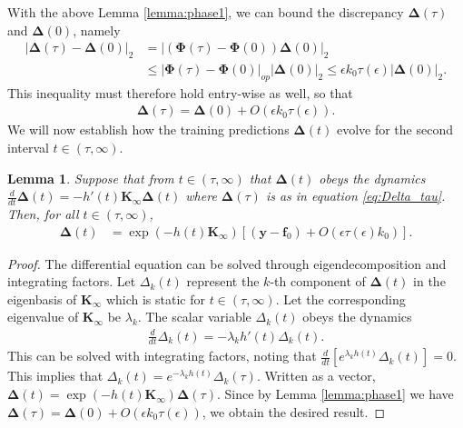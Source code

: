 \documentclass{article} %
\newtheorem{lemma}{Lemma}
\begin{document}
\begin{appendix}
With the above Lemma \ref{lemma:phase1}, we can bound the discrepancy $\bm\Delta(\tau)$ and $\bm\Delta(0)$, namely
\begin{equation}
\begin{aligned}
    |\bm\Delta(\tau) - \bm\Delta(0)|_2 &= |(\bm\Phi(\tau) - \bm\Phi(0) ) \bm\Delta(0)|_2\\
    &\leq |\bm \Phi(\tau) - \bm\Phi(0)|_{op} |\bm\Delta(0)|_2 \leq \epsilon k_0 \tau(\epsilon) |\bm\Delta(0)|_2.
\end{aligned}
\end{equation}
This inequality must therefore hold entry-wise as well, so that
\begin{align}\label{eq:Delta_tau}
    \bm\Delta(\tau)  = \bm\Delta(0) + O(\epsilon k_0 \tau(\epsilon)) .
\end{align} 
We will now establish how the training predictions $\bm\Delta(t)$ evolve for the second interval $t \in (\tau,\infty)$.
\begin{lemma}\label{lemma:phase2}
    Suppose that from $t\in(\tau,\infty)$ that $\bm\Delta(t)$ obeys the dynamics $\frac{d}{dt} \bm\Delta(t) = - h'(t) \bm K_{\infty} \bm\Delta(t)$ where $\bm \Delta(\tau)$ is as in equation \ref{eq:Delta_tau}. Then, for all $t \in (\tau,\infty)$, 
    \begin{equation}
\begin{aligned}
    \bm\Delta(t) &=   \exp\left( - h(t) \bm K_{\infty}  \right) \left[  (\bm y - \bm f_0) +  O(\epsilon \tau(\epsilon) k_0) \right] .
\end{aligned}
\end{equation}
\end{lemma}
\begin{proof}
    The differential equation can be solved through eigendecomposition and integrating factors. Let $\Delta_k(t)$ represent the $k$-th component of $\bm\Delta(t)$ in the eigenbasis of $\bm K_{\infty}$ which is static for $t\in(\tau,\infty)$. Let the corresponding eigenvalue of $\bm K_{\infty}$ be $\lambda_k$. The scalar variable $\Delta_k(t)$ obeys the dynamics
    \begin{align}
        \frac{d}{dt} \Delta_k(t) = - \lambda_k h'(t)  \Delta_k(t).
    \end{align}
    This can be solved with integrating factors, noting that $\frac{d}{dt} \left[ e^{\lambda_k h(t) } \Delta_k(t) \right] = 0$. This implies that $\Delta_k(t) = e^{-\lambda_k h(t)} \Delta_k(\tau)$. Written as a vector, $\bm\Delta(t) = \exp\left( - h(t) \bm K_{\infty} \right) \bm\Delta(\tau)$. Since by Lemma \ref{lemma:phase1} we have $\bm\Delta(\tau) = \bm\Delta(0) + O(\epsilon k_0 \tau(\epsilon))$, we obtain the desired result.

\end{proof}
\end{appendix}
\end{document}
